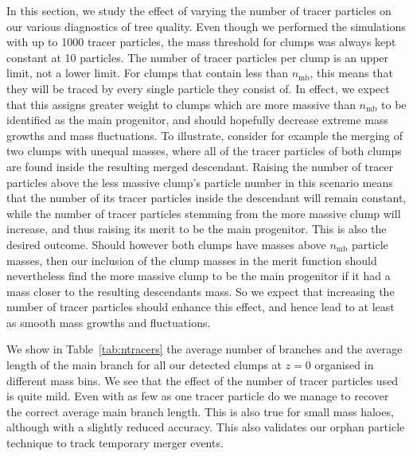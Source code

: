 In this section, we study the effect of varying the number of tracer
particles on our various diagnostics of tree quality.
Even though we performed the simulations with
up to 1000 tracer particles, the mass threshold for clumps was always
kept constant at 10 particles. The number of tracer particles per clump
is an upper limit, not a lower limit. For clumps that contain less than
$n_{\mathrm{mb}}$, this means that they will be traced by every single
particle they consist of. In effect, we expect that this assigns greater
weight to clumps which are more massive than $n_{\mathrm{mb}}$ to be identified
as the main progenitor, and should hopefully decrease extreme
mass growths and mass fluctuations. To illustrate, consider for example the
merging of two clumps with unequal masses, where
all of the tracer particles of both clumps are found inside the resulting
merged descendant. Raising the number of tracer particles above the less
massive clump's particle number in this scenario means that the number of
its tracer particles inside the descendant will remain constant, while
the number of tracer particles stemming from the more massive clump will
increase, and thus raising its merit to be the main progenitor. This is
also the desired outcome.
Should however both clumps have masses above $n_{\mathrm{mb}}$ particle masses,
then our inclusion of the clump masses in the merit function should
nevertheless find the more massive clump to be the main progenitor if it
had a mass closer to the resulting descendants mass. So we expect that
increasing the number of tracer particles should enhance this effect,
and hence lead to at least as smooth mass growths and fluctuations.



We show in
Table~\ref{tab:ntracers} the average number of branches and the
average length of the main branch for all our detected clumps at $z=0$
organised in different mass bins. We see that the effect of the number
of tracer particles used is quite mild. Even with as few as one tracer
particle do we manage to recover the correct average main branch
length. This is also true for small mass haloes, although with a
slightly reduced accuracy. This also validates our orphan particle
technique to track temporary merger events.

